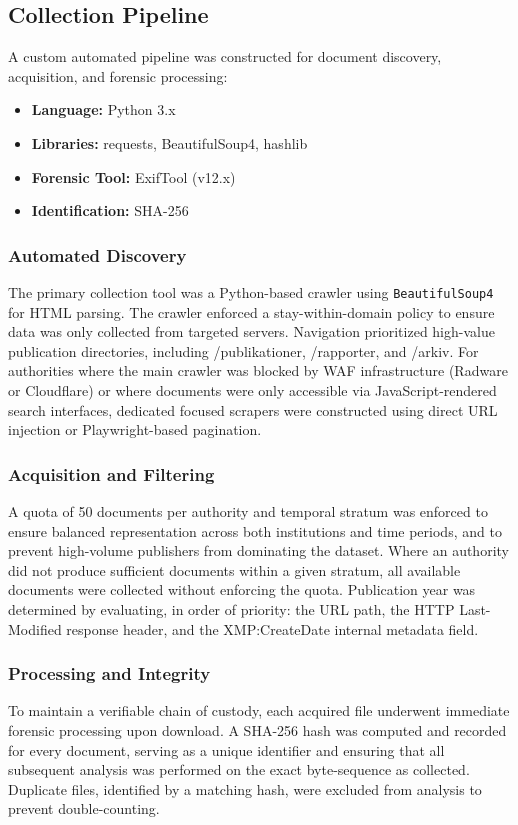 \documentclass[conference]{IEEEtran}
\begin{document}
\subsection{Collection Pipeline}
A custom automated pipeline was constructed for document discovery, acquisition, and forensic processing:
\begin{itemize}
    \item \textbf{Language:} Python 3.x
    \item \textbf{Libraries:} requests, BeautifulSoup4, hashlib
    \item \textbf{Forensic Tool:} ExifTool (v12.x)
    \item \textbf{Identification:} SHA-256
\end{itemize}

\subsubsection{Automated Discovery}
The primary collection tool was a Python-based crawler using \texttt{BeautifulSoup4} for HTML parsing. The crawler enforced a stay-within-domain policy to ensure data was only collected from targeted servers. Navigation prioritized high-value publication directories, including /publikationer, /rapporter, and /arkiv. For authorities where the main crawler was blocked by WAF infrastructure (Radware or Cloudflare) or where documents were only accessible via JavaScript-rendered search interfaces, dedicated focused scrapers were constructed using direct URL injection or Playwright-based pagination.

\subsubsection{Acquisition and Filtering}
A quota of 50 documents per authority and temporal stratum was enforced to ensure balanced representation across both institutions and time periods, and to prevent high-volume publishers from dominating the dataset. Where an authority did not produce sufficient documents within a given stratum, all available documents were collected without enforcing the quota. Publication year was determined by evaluating, in order of priority: the URL path, the HTTP Last-Modified response header, and the XMP:CreateDate internal metadata field.

\subsubsection{Processing and Integrity}
To maintain a verifiable chain of custody, each acquired file underwent immediate forensic processing upon download. A SHA-256 hash was computed and recorded for every document, serving as a unique identifier and ensuring that all subsequent analysis was performed on the exact byte-sequence as collected. Duplicate files, identified by a matching hash, were excluded from analysis to prevent double-counting.
\end{document}
